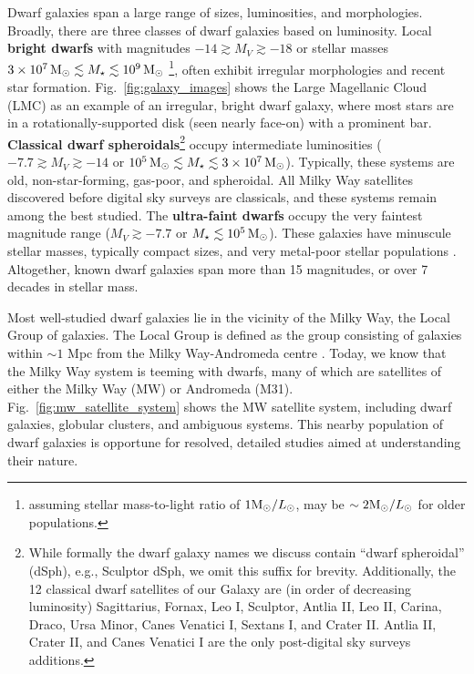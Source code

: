 Dwarf galaxies span a large range of sizes, luminosities, and
morphologies. Broadly, there are three classes of dwarf galaxies based
on luminosity. Local \textbf{bright dwarfs} with magnitudes
\(-14 \gtrsim M_V \gtrsim  -18\) or stellar masses
\(3\times10^7\,{\rm M}_{\odot} \lesssim M_\star \lesssim 10^9\,{\rm M}_{\odot}\) \footnote{assuming
  stellar mass-to-light ratio of \(1 {\rm M}_{\odot} / L_{\odot}\), may be
  \(\sim 2 {\rm M}_{\odot}/L_\odot\) for older populations.}, often exhibit
irregular morphologies and recent star formation.
Fig.~\ref{fig:galaxy_images} shows the Large Magellanic Cloud (LMC) as
an example of an irregular, bright dwarf galaxy, where most stars are in
a rotationally-supported disk (seen nearly face-on) with a prominent
bar. \textbf{Classical dwarf spheroidals}\footnote{While formally the
  dwarf galaxy names we discuss contain ``dwarf spheroidal'' (dSph),
  e.g., Sculptor dSph, we omit this suffix for brevity. Additionally,
  the 12 classical dwarf satellites of our Galaxy are (in order of
  decreasing luminosity) Sagittarius, Fornax, Leo I, Sculptor, Antlia
  II, Leo II, Carina, Draco, Ursa Minor, Canes Venatici I, Sextans I,
  and Crater II. Antlia II, Crater II, and Canes Venatici I are the only
  post-digital sky surveys additions.} occupy intermediate luminosities
( \(-7.7 \gtrsim M_V  \gtrsim -14\) or
\(10^5\,{\rm M}_{\odot} \lesssim M_\star \lesssim 3\times10^7\,{\rm M}_{\odot}\)). Typically,
these systems are old, non-star-forming, gas-poor, and spheroidal. All
Milky Way satellites discovered before digital sky surveys are
classicals, and these systems remain among the best studied. The
\textbf{ultra-faint dwarfs} occupy the very faintest magnitude range
(\(M_V \gtrsim -7.7\) or \(M_\star \lesssim 10^5\,{\rm M}_{\odot}\)). These galaxies
have minuscule stellar masses, typically compact sizes, and very
metal-poor stellar populations \citep[see the review by][]{simon2019}.
Altogether, known dwarf galaxies span more than 15 magnitudes, or over 7
decades in stellar mass.

Most well-studied dwarf galaxies lie in the vicinity of the Milky Way,
the Local Group of galaxies. The Local Group is defined as the group
consisting of galaxies within \(\sim 1\) Mpc from the Milky
Way-Andromeda centre \citep[e.g.,][ and references
therein]{mcconnachie2012}. Today, we know that the Milky Way system is
teeming with dwarfs, many of which are satellites of either the Milky
Way (MW) or Andromeda (M31). Fig.~\ref{fig:mw_satellite_system} shows
the MW satellite system, including dwarf galaxies, globular clusters,
and ambiguous systems. This nearby population of dwarf galaxies is
opportune for resolved, detailed studies aimed at understanding their
nature.

